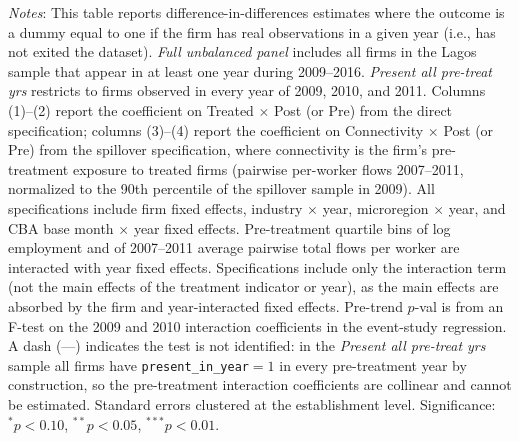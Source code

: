 \begin{table}[H]
\begin{minipage}{\textwidth}
\textit{Notes}: This table reports difference-in-differences estimates where the outcome is a dummy equal to one if the firm has real observations in a given year (i.e., has not exited the dataset). \textit{Full unbalanced panel} includes all firms in the Lagos sample that appear in at least one year during 2009--2016. \textit{Present all pre-treat yrs} restricts to firms observed in every year of 2009, 2010, and 2011. Columns (1)--(2) report the coefficient on Treated $\times$ Post (or Pre) from the direct specification; columns (3)--(4) report the coefficient on Connectivity $\times$ Post (or Pre) from the spillover specification, where connectivity is the firm's pre-treatment exposure to treated firms (pairwise per-worker flows 2007--2011, normalized to the 90th percentile of the spillover sample in 2009). All specifications include firm fixed effects, industry $\times$ year, microregion $\times$ year, and CBA base month $\times$ year fixed effects. Pre-treatment quartile bins of log employment and of 2007--2011 average pairwise total flows per worker are interacted with year fixed effects. Specifications include only the interaction term (not the main effects of the treatment indicator or year), as the main effects are absorbed by the firm and year-interacted fixed effects. Pre-trend $p$-val is from an F-test on the 2009 and 2010 interaction coefficients in the event-study regression. A dash (---) indicates the test is not identified: in the \textit{Present all pre-treat yrs} sample all firms have \texttt{present\_in\_year}$=1$ in every pre-treatment year by construction, so the pre-treatment interaction coefficients are collinear and cannot be estimated. Standard errors clustered at the establishment level. Significance: $^{*}p{<}0.10$, $^{**}p{<}0.05$, $^{***}p{<}0.01$.
\end{minipage}
\end{table}
